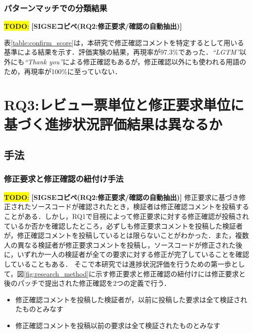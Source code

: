 \documentclass[11pt]{jreport}
\newcommand{\RQThree}{レビュー票単位と修正要求単位に基づく進捗状況評価結果は異なるか}
\newcommand{\todo}[1]{\colorbox{yellow}{{\bf TODO}:}{\color{red} {\textbf{[#1]}}}}
\begin{document}
\subsection{パターンマッチでの分類結果}

\todo{SIGSEコピペ(RQ2:修正要求/確認の自動抽出)}
\begin{table}[t]
\centering
  \caption{修正確認コメントの予測精度}
  \label{table:confirm_score}
\end{table}

表\ref{table:confirm_score}は，本研究で修正確認コメントを特定するとして用いる基準による結果を示す．評価実験の結果，再現率が97.3\%であった．\textit{``LGTM''}以外にも\textit{``Thank you''}による修正確認もあるが，修正確認以外にも使われる用語のため，再現率が100\%に至っていない．

\chapter{RQ3:\RQThree}\label{sec:RQ3}

\section{手法}
\subsection{修正要求と修正確認の紐付け手法}
\todo{SIGSEコピペ(RQ2:修正要求/確認の自動抽出)}
修正要求に基づき修正されたソースコードが確認されたとき，検証者は修正確認コメントを投稿することがある．しかし，RQ1で目視によって修正要求に対する修正確認が投稿されているか否かを確認したところ，必ずしも修正要求コメントを投稿した検証者が，修正確認コメントを投稿しているとは限らないことがわかった．また，複数人の異なる検証者が修正要求コメントを投稿し，ソースコードが修正された後に，いずれか一人の検証者が全ての要求に対する修正が完了していることを確認していることもある．
そこで本研究では進捗状況評価を行うための第一歩として，図\ref{fig:research_method}に示す修正要求と修正確認の紐付けには修正要求と後のパッチで提出された修正確認を2つの定義で行う．
\begin{itemize}
\item 修正確認コメントを投稿した検証者が，以前に投稿した要求は全て検証されたものとみなす
\item 修正確認コメントを投稿以前の要求は全て検証されたものとみなす
\end{itemize}
\end{document}
